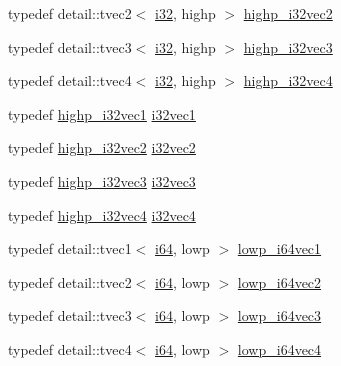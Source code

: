 \begin{CompactItemize}
\item 
typedef detail::tvec2$<$ \hyperlink{group__gtc__type__precision_g1d8ed5c43e91ea7d4528389da4fa9524}{i32}, highp $>$ \hyperlink{group__gtc__type__precision_g6020d795076243085eb0d6826c849b4a}{highp\_\-i32vec2}
\item 
typedef detail::tvec3$<$ \hyperlink{group__gtc__type__precision_g1d8ed5c43e91ea7d4528389da4fa9524}{i32}, highp $>$ \hyperlink{group__gtc__type__precision_g95de80f73e676fb6b9976ff0d33bbc4b}{highp\_\-i32vec3}
\item 
typedef detail::tvec4$<$ \hyperlink{group__gtc__type__precision_g1d8ed5c43e91ea7d4528389da4fa9524}{i32}, highp $>$ \hyperlink{group__gtc__type__precision_g174af0fafdc5a9eb24150792bffa8b5c}{highp\_\-i32vec4}
\item 
typedef \hyperlink{group__gtc__type__precision_gdcd58130a48fa561e784a135a88c5d6e}{highp\_\-i32vec1} \hyperlink{group__gtc__type__precision_g0d3741d44591183f3dee9500b4ad9ab4}{i32vec1}
\item 
typedef \hyperlink{group__gtc__type__precision_g6020d795076243085eb0d6826c849b4a}{highp\_\-i32vec2} \hyperlink{group__gtc__type__precision_gbb9ac4a278f8a8e3a3928dc9bef81089}{i32vec2}
\item 
typedef \hyperlink{group__gtc__type__precision_g95de80f73e676fb6b9976ff0d33bbc4b}{highp\_\-i32vec3} \hyperlink{group__gtc__type__precision_g79a21b299190b6fee673087376753db0}{i32vec3}
\item 
typedef \hyperlink{group__gtc__type__precision_g174af0fafdc5a9eb24150792bffa8b5c}{highp\_\-i32vec4} \hyperlink{group__gtc__type__precision_g5fea6ade2c848bca1fa55636e75a10b9}{i32vec4}
\item 
typedef detail::tvec1$<$ \hyperlink{group__gtc__type__precision_gc7a7eaad46064fc952b06df33689da23}{i64}, lowp $>$ \hyperlink{group__gtc__type__precision_gf427ced1906a1788fdd9faab2e57c60a}{lowp\_\-i64vec1}
\item 
typedef detail::tvec2$<$ \hyperlink{group__gtc__type__precision_gc7a7eaad46064fc952b06df33689da23}{i64}, lowp $>$ \hyperlink{group__gtc__type__precision_gd88a04aaa07fabf57fdbad8e6b7bcc9c}{lowp\_\-i64vec2}
\item 
typedef detail::tvec3$<$ \hyperlink{group__gtc__type__precision_gc7a7eaad46064fc952b06df33689da23}{i64}, lowp $>$ \hyperlink{group__gtc__type__precision_ga42f666ccdb6d1ef6326882b4f377678}{lowp\_\-i64vec3}
\item 
typedef detail::tvec4$<$ \hyperlink{group__gtc__type__precision_gc7a7eaad46064fc952b06df33689da23}{i64}, lowp $>$ \hyperlink{group__gtc__type__precision_g95c13b9d4f94d1783e7d96534d1651d8}{lowp\_\-i64vec4}

\end{CompactItemize}
